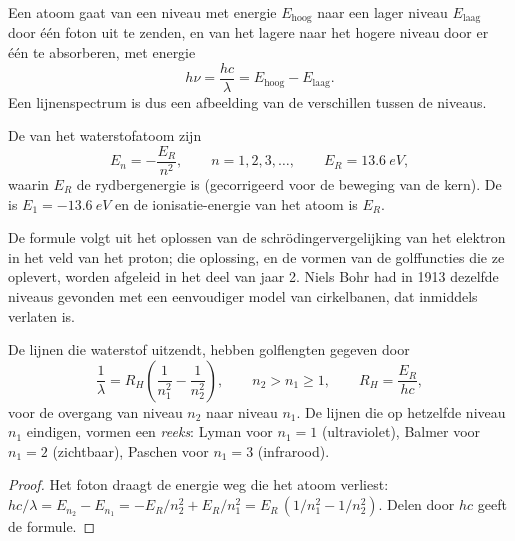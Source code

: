 Een atoom gaat van een niveau met energie $E_{\text{hoog}}$ naar een lager
niveau $E_{\text{laag}}$ door één foton uit te zenden, en van het lagere
naar het hogere niveau door er één te absorberen, met energie
\[
  h\nu = \frac{hc}{\lambda} = E_{\text{hoog}} - E_{\text{laag}} .
\]
Een lijnenspectrum is dus een afbeelding van de verschillen tussen de
niveaus.

\begin{theorem}\label{thm:b1:quantum-numbers:levels}
De  van het waterstofatoom zijn
\[
  E_n = -\frac{E_R}{n^2}, \qquad n = 1, 2, 3, \dots,
  \qquad E_R = \qty{13.6}{eV},
\]
waarin $E_R$ de rydbergenergie is (gecorrigeerd voor de beweging van de
kern). De  is $E_1 = \qty{-13.6}{eV}$ en de
ionisatie-energie van het atoom is $E_R$.
\end{theorem}
\admitted

\begin{remark}\label{rem:b1:quantum-numbers:schrodinger}
De formule volgt uit het oplossen van de schrödingervergelijking van het
elektron in het veld van het proton; die oplossing, en de vormen van de
golffuncties die ze oplevert, worden afgeleid in het deel van jaar 2.
Niels Bohr had in 1913 dezelfde niveaus gevonden met een eenvoudiger
model van cirkelbanen, dat inmiddels verlaten is.
\end{remark}

\begin{proposition}\label{prop:b1:quantum-numbers:rydberg}
De lijnen die waterstof uitzendt, hebben golflengten gegeven door
\[
  \frac{1}{\lambda} = R_H\left(\frac{1}{n_1^2} - \frac{1}{n_2^2}\right),
  \qquad n_2 > n_1 \ge 1, \qquad R_H = \frac{E_R}{hc},
\]
voor de overgang van niveau $n_2$ naar niveau $n_1$. De lijnen die op
hetzelfde niveau $n_1$ eindigen, vormen een \emph{reeks}: Lyman voor
$n_1 = 1$ (ultraviolet), Balmer voor $n_1 = 2$ (zichtbaar), Paschen voor
$n_1 = 3$ (infrarood).
\end{proposition}

\begin{proof}
Het foton draagt de energie weg die het atoom verliest:
$hc/\lambda = E_{n_2} - E_{n_1} = -E_R/n_2^2 + E_R/n_1^2
= E_R\,(1/n_1^2 - 1/n_2^2)$. Delen door $hc$ geeft de formule.
\end{proof}

